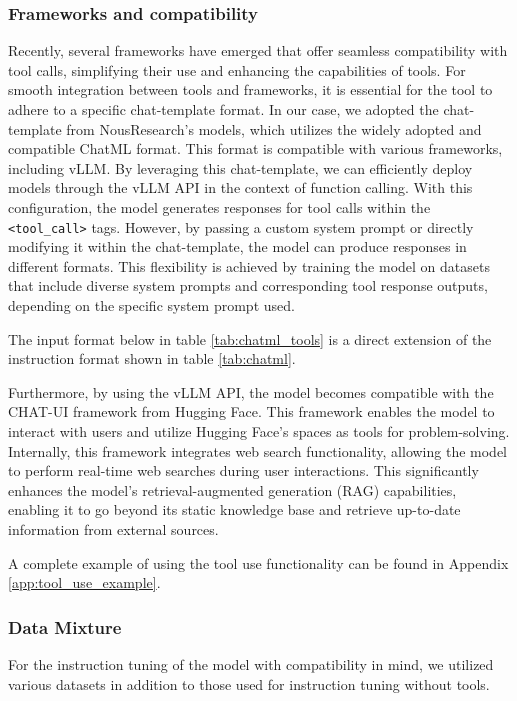 \subsubsection{Frameworks and compatibility}
Recently, several frameworks have emerged that offer seamless compatibility with tool calls, simplifying their use and enhancing the capabilities of tools. For smooth integration between tools and frameworks, it is essential for the tool to adhere to a specific chat-template format. In our case, we adopted the chat-template from NousResearch's models, which utilizes the widely adopted and compatible ChatML format. This format is compatible with various frameworks, including vLLM. By leveraging this chat-template, we can efficiently deploy models through the vLLM API in the context of function calling.
With this configuration, the model generates responses for tool calls within the \texttt{<tool\_call>} tags. However, by passing a custom system prompt or directly modifying it within the chat-template, the model can produce responses in different formats. This flexibility is achieved by training the model on datasets that include diverse system prompts and corresponding tool response outputs, depending on the specific system prompt used.

The input format below in table \ref{tab:chatml_tools} is a direct extension of the instruction format shown in table \ref{tab:chatml}.



Furthermore, by using the vLLM API, the model becomes compatible with the CHAT-UI framework from Hugging Face. This framework enables the model to interact with users and utilize Hugging Face's spaces as tools for problem-solving. Internally, this framework integrates web search functionality, allowing the model to perform real-time web searches during user interactions. This significantly enhances the model's retrieval-augmented generation (RAG) capabilities, enabling it to go beyond its static knowledge base and retrieve up-to-date information from external sources.

A complete example of using the tool use functionality can be found in Appendix \ref{app:tool_use_example}.

\subsubsection{Data Mixture}
For the instruction tuning of the model with compatibility in mind, we utilized various datasets in addition to those used for instruction tuning without tools.

